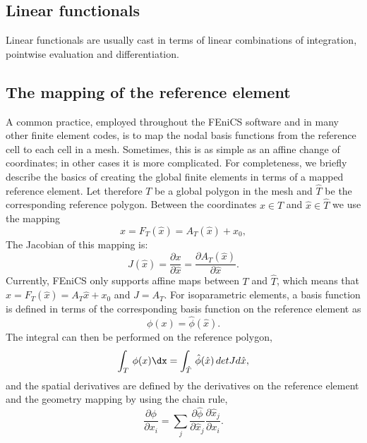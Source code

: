 \subsection{Linear functionals}

Linear functionals are usually cast in terms of linear combinations of
integration, pointwise evaluation and differentiation.


\subsection{The mapping of the reference element}

A common practice, employed throughout the FEniCS software and in many
other finite element codes, is to map the nodal basis functions from the
reference cell to each cell in a mesh.  Sometimes, this is as simple as
an affine change of coordinates; in other cases it is more complicated.
For completeness, we briefly describe the basics of creating the global
finite elements in terms of a mapped reference element. Let therefore
$T$ be a global polygon in the mesh and $\hat{T}$ be the corresponding
reference polygon.  Between the coordinates $x\in T$ and $\hat x\in\hat T$
we use the mapping
\begin{equation}
\label{eq:geometry}
x = F_T(\hat x) = A_T(\hat x)  + x_0,
\end{equation}
The Jacobian of this mapping is:
\begin{equation}
\label{eq:geometry2}
J(\hat x) =  \frac{\partial x }{\partial \hat x}  =    \frac{\partial A_T(\hat x) }{\partial \hat x} .
\end{equation}
Currently, FEniCS only supports affine maps between $T$ and $\hat{T}$,
which means that $x = F_T(\hat x) = A_T\hat x + x_0$ and $J=A_T$.
For isoparametric elements, a basis function is defined in terms of the
corresponding basis function on the reference element as
\begin{equation}
\phi(x) = \hat{\phi}(\hat x).
\end{equation}
The integral can then be performed on the reference polygon,
\begin{equation}
\label{eq:integration2}
\int_T \, \phi (x) \dx = \int_{\hat{T}} \, \hat \phi (\hat x) \, detJ d\hat x ,
\end{equation}
and the spatial derivatives are defined by the derivatives on the
reference element and the geometry mapping by using the chain rule,
\begin{equation}
\label{eq:chain}
\frac{\partial \phi}{\partial x_i} =
\sum_j \frac{\partial \hat \phi}{\partial \hat x_j} \frac{\partial \hat x_j }{\partial x_i }  .
\end{equation}

